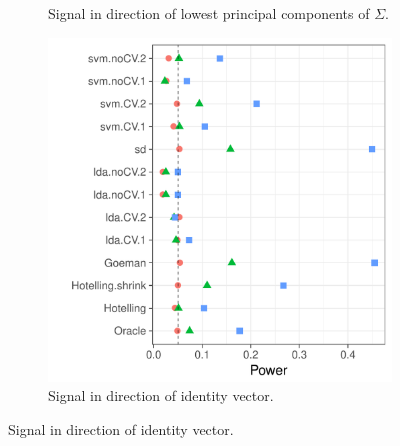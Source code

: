 \documentclass[12pt,a4paper]{article}
\begin{document}
\begin{figure}[h]
\begin{subfigure}[t]{.3\textwidth}
		\caption{Signal in direction of lowest principal components of $\Sigma$.} 
		\label{fig:dependence_22}
	\end{subfigure}
	\begin{subfigure}[t]{.3\textwidth}
		\centering
		\includegraphics[width=1\linewidth]{"art/file16"}
		\caption{Signal in direction of identity vector.} 
		\label{fig:dependence_23}
	\end{subfigure}
\end{figure}
\end{document}
